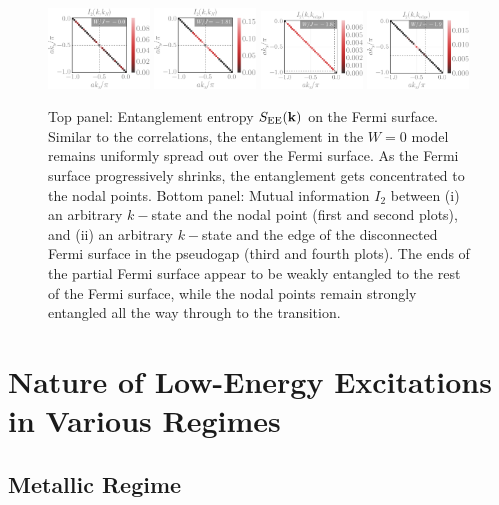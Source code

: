 \documentclass[reprint,hidelinks,onecolumn]{revtex4-2}
\begin{document}
\begin{figure}[htpb]
	\includegraphics[width=0.24\textwidth]{tiled_I2_k_N-1.pdf}
	\includegraphics[width=0.24\textwidth]{tiled_I2_k_N-2.pdf}
	\includegraphics[width=0.24\textwidth]{tiled_I2_k_edge-2.pdf}
	\includegraphics[width=0.24\textwidth]{tiled_I2_k_edge-3.pdf}
	\caption{Top panel: Entanglement entropy \(S_\text{EE}({\bf k})\) on the Fermi surface. Similar to the correlations, the entanglement in the \(W=0\) model remains uniformly spread out over the Fermi surface. As the Fermi surface progressively shrinks, the entanglement gets concentrated to the nodal points. Bottom panel: Mutual information \(I_2\) between (i) an arbitrary \(k-\)state and the nodal point (first and second plots), and (ii) an arbitrary \(k-\)state and the edge of the disconnected Fermi surface in the pseudogap (third and fourth plots). The ends of the partial Fermi surface appear to be weakly entangled to the rest of the Fermi surface, while the nodal points remain strongly entangled all the way through to the transition.}
	\label{tiledEntanglement}
\end{figure}

\section{Nature of Low-Energy Excitations in Various Regimes}
\subsection{Metallic Regime}
\end{document}
